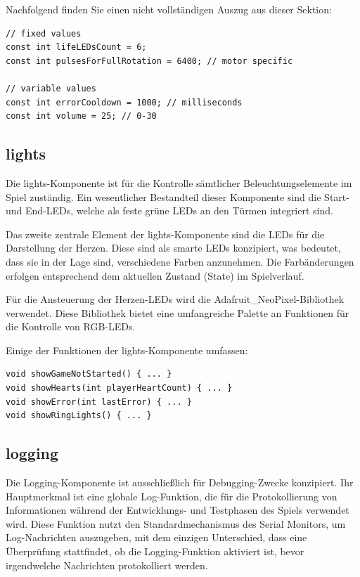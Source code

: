 Nachfolgend finden Sie einen nicht vollständigen Auszug aus dieser Sektion:

\begin{minipage}{\linewidth}
\begin{lstlisting}
// fixed values
const int lifeLEDsCount = 6;
const int pulsesForFullRotation = 6400; // motor specific

// variable values
const int errorCooldown = 1000; // milliseconds
const int volume = 25; // 0-30
\end{lstlisting}
\end{minipage}

\subsection{lights}

Die lights-Komponente ist für die Kontrolle sämtlicher Beleuchtungselemente im Spiel zuständig. Ein wesentlicher Bestandteil dieser Komponente sind die Start- und End-LEDs, welche als feste grüne LEDs an den Türmen integriert sind.

Das zweite zentrale Element der lights-Komponente sind die LEDs für die Darstellung der Herzen. Diese sind als smarte LEDs konzipiert, was bedeutet, dass sie in der Lage sind, verschiedene Farben anzunehmen. Die Farbänderungen erfolgen entsprechend dem aktuellen Zustand (State) im Spielverlauf. 

Für die Ansteuerung der Herzen-LEDs wird die Adafruit\_NeoPixel-Bibliothek verwendet. Diese Bibliothek bietet eine umfangreiche Palette an Funktionen für die Kontrolle von RGB-LEDs.

Einige der Funktionen der lights-Komponente umfassen:

\begin{minipage}{\linewidth}
\begin{lstlisting}
void showGameNotStarted() { ... }
void showHearts(int playerHeartCount) { ... }
void showError(int lastError) { ... }
void showRingLights() { ... }
\end{lstlisting}
\end{minipage}    

\subsection{logging}

Die Logging-Komponente ist ausschließlich für Debugging-Zwecke konzipiert. Ihr Hauptmerkmal ist eine globale Log-Funktion, die für die Protokollierung von Informationen während der Entwicklungs- und Testphasen des Spiels verwendet wird. Diese Funktion nutzt den Standardmechanismus des Serial Monitors, um Log-Nachrichten auszugeben, mit dem einzigen Unterschied, dass eine Überprüfung stattfindet, ob die Logging-Funktion aktiviert ist, bevor irgendwelche Nachrichten protokolliert werden.

